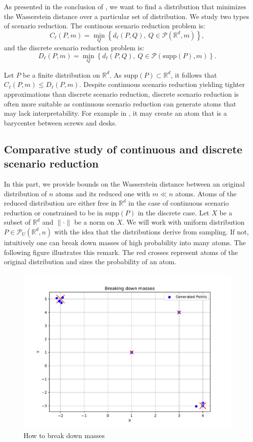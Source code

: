 \documentclass{amsart}
\newcommand{\RR}{\mathbb{R}}
\begin{document}
As presented in the conclusion of , we want to find a distribution that minimizes the Wasserstein distance over a particular set of distribution. We study two types of scenario reduction. The continous scenario reduction problem is:
$$
C_\ell(P,m)=\min_Q\left\{d_\ell(P,Q),\: Q\in\mathcal{P}\left(\mathbb{R}^d,m\right)\right\}, 
$$
and the discrete scenario reduction problem is:
$$
D_\ell(P,m)=\min_Q\left\{d_\ell(P,Q),\: Q\in\mathcal{P}(\text{supp}\left(P\right),m)\right\}.
$$

Let $P$ be a finite distribution on $\RR^d$. As $\text{supp}\left(P\right)\subset \RR^d$, it follows that $C_\ell\left(P,m\right)\leq D_\ell\left(P,m\right)$. Despite continuous scenario reduction yielding tighter approximations than discrete scenario reduction, discrete scenario reduction is often more suitable as continuous scenario reduction can generate atoms that may lack interpretability. For example in , it may create an atom that is a barycenter between screws and desks.

\subsection{Comparative study of continuous and discrete scenario reduction}\label{comparative}

In this part, we provide bounds on the Wasserstein distance between an original distribution of $n$ atoms and its reduced one with $m\ll n$ atoms. Atoms of the reduced distribution are either free in $\RR^d$ in the case of continuous scenario reduction or constrained to be in $\text{supp}\left(P\right)$ in the discrete case. Let $X$ be a subset of $\RR^d$ and $\lVert \cdot \rVert$ be a norm on $X$. We will work with uniform distribution $P\in\mathcal{P}_U\left(\RR^d,n\right)$ with the idea that the distributions derive from sampling. If not, intuitively one can break down masses of high probability into many atoms. The following figure  illustrates this remark. The red crosses represent atoms of the original distribution and sizes the probability of an atom. \clearpage

\begin{figure}[!h]
    \centering
    \includegraphics[width=0.40\linewidth]{plots/break down.pdf}
    \caption{How to break down masses}
    \label{break down}
\end{figure}
\end{document}
